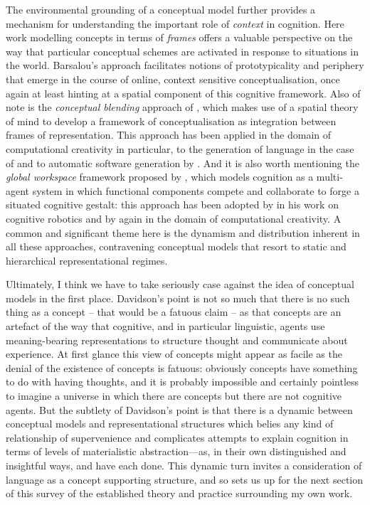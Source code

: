 The environmental grounding of a conceptual model further provides a mechanism for understanding the important role of \emph{context} in cognition.  Here  work modelling concepts in terms of \emph{frames} offers a valuable perspective on the way that particular conceptual schemes are activated in response to situations in the world.  Barsalou's approach facilitates notions of prototypicality and periphery that emerge in the course of online, context sensitive conceptualisation, once again at least hinting at a spatial component of this cognitive framework.  Also of note is the \emph{conceptual blending} approach of \cite{FauconnierEA1998}, which makes use of a spatial theory of mind to develop a framework of conceptualisation as integration between frames of representation.  This approach has been applied in the domain of computational creativity in particular, to the generation of language in the case of \cite{Veale2012b} and to automatic software generation by \cite{ZnidarsicEA2016}.  And it is also worth mentioning the \emph{global workspace} framework proposed by \cite{Baars1988}, which models cognition as a multi-agent system in which functional components compete and collaborate to forge a situated cognitive gestalt: this approach has been adopted by \cite{Shanahan2010} in his work on cognitive robotics and by \cite{Wiggins2012} again in the domain of computational creativity.  A common and significant theme here is the dynamism and distribution inherent in all these approaches, contravening conceptual models that resort to static and hierarchical representational regimes.

Ultimately, I think we have to take seriously  case against the idea of conceptual models in the first place.  Davidson's point is not so much that there is no such thing as a concept -- that would be a fatuous claim -- as that concepts are an artefact of the way that cognitive, and in particular linguistic, agents use meaning-bearing representations to structure thought and communicate about experience.  At first glance this view of concepts might appear as facile as the denial of the existence of concepts is fatuous: obviously concepts have something to do with having thoughts, and it is probably impossible and certainly pointless to imagine a universe in which there are concepts but there are not cognitive agents.  But the subtlety of Davidson's point is that there is a dynamic between conceptual models and representational structures which belies any kind of relationship of supervenience and complicates attempts to explain cognition in terms of levels of materialistic abstraction---as, in their own distinguished and insightful ways, \cite{Floridi2011} and \cite{Deacon2011} have each done.  This dynamic turn invites a consideration of language as a concept supporting structure, and so sets us up for the next section of this survey of the established theory and practice surrounding my own work.


